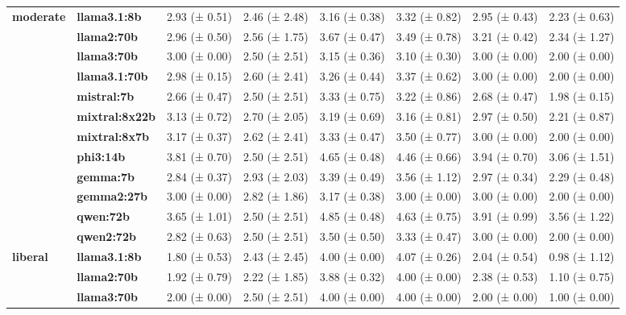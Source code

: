 \begin{longtable}{llllllll}
\cline{1-8}
\multirow[t]{12}{*}{\textbf{moderate}} & \textbf{llama3.1:8b} & 2.93 (± 0.51) & 2.46 (± 2.48) & 3.16 (± 0.38) & 3.32 (± 0.82) & 2.95 (± 0.43) & 2.23 (± 0.63) \\
\textbf{} & \textbf{llama2:70b} & 2.96 (± 0.50) & 2.56 (± 1.75) & 3.67 (± 0.47) & 3.49 (± 0.78) & 3.21 (± 0.42) & 2.34 (± 1.27) \\
\textbf{} & \textbf{llama3:70b} & 3.00 (± 0.00) & 2.50 (± 2.51) & 3.15 (± 0.36) & 3.10 (± 0.30) & 3.00 (± 0.00) & 2.00 (± 0.00) \\
\textbf{} & \textbf{llama3.1:70b} & 2.98 (± 0.15) & 2.60 (± 2.41) & 3.26 (± 0.44) & 3.37 (± 0.62) & 3.00 (± 0.00) & 2.00 (± 0.00) \\
\textbf{} & \textbf{mistral:7b} & 2.66 (± 0.47) & 2.50 (± 2.51) & 3.33 (± 0.75) & 3.22 (± 0.86) & 2.68 (± 0.47) & 1.98 (± 0.15) \\
\textbf{} & \textbf{mixtral:8x22b} & 3.13 (± 0.72) & 2.70 (± 2.05) & 3.19 (± 0.69) & 3.16 (± 0.81) & 2.97 (± 0.50) & 2.21 (± 0.87) \\
\textbf{} & \textbf{mixtral:8x7b} & 3.17 (± 0.37) & 2.62 (± 2.41) & 3.33 (± 0.47) & 3.50 (± 0.77) & 3.00 (± 0.00) & 2.00 (± 0.00) \\
\textbf{} & \textbf{phi3:14b} & 3.81 (± 0.70) & 2.50 (± 2.51) & 4.65 (± 0.48) & 4.46 (± 0.66) & 3.94 (± 0.70) & 3.06 (± 1.51) \\
\textbf{} & \textbf{gemma:7b} & 2.84 (± 0.37) & 2.93 (± 2.03) & 3.39 (± 0.49) & 3.56 (± 1.12) & 2.97 (± 0.34) & 2.29 (± 0.48) \\
\textbf{} & \textbf{gemma2:27b} & 3.00 (± 0.00) & 2.82 (± 1.86) & 3.17 (± 0.38) & 3.00 (± 0.00) & 3.00 (± 0.00) & 2.00 (± 0.00) \\
\textbf{} & \textbf{qwen:72b} & 3.65 (± 1.01) & 2.50 (± 2.51) & 4.85 (± 0.48) & 4.63 (± 0.75) & 3.91 (± 0.99) & 3.56 (± 1.22) \\
\textbf{} & \textbf{qwen2:72b} & 2.82 (± 0.63) & 2.50 (± 2.51) & 3.50 (± 0.50) & 3.33 (± 0.47) & 3.00 (± 0.00) & 2.00 (± 0.00) \\
\cline{1-8}
\multirow[t]{12}{*}{\textbf{liberal}} & \textbf{llama3.1:8b} & 1.80 (± 0.53) & 2.43 (± 2.45) & 4.00 (± 0.00) & 4.07 (± 0.26) & 2.04 (± 0.54) & 0.98 (± 1.12) \\
\textbf{} & \textbf{llama2:70b} & 1.92 (± 0.79) & 2.22 (± 1.85) & 3.88 (± 0.32) & 4.00 (± 0.00) & 2.38 (± 0.53) & 1.10 (± 0.75) \\
\textbf{} & \textbf{llama3:70b} & 2.00 (± 0.00) & 2.50 (± 2.51) & 4.00 (± 0.00) & 4.00 (± 0.00) & 2.00 (± 0.00) & 1.00 (± 0.00) \\

\end{longtable}
